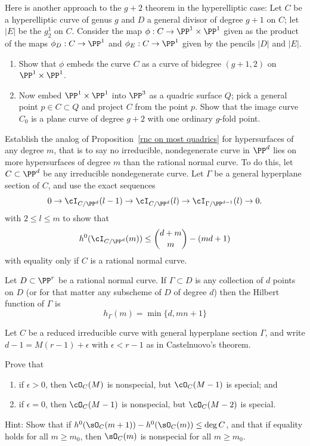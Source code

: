 \begin{exercise}
Here is another approach to the $g+2$ theorem in the hyperelliptic case: 
Let $C$ be a hyperelliptic curve of genus $g$ and $D$ a general divisor of degree $g+1$ on $C$; let $|E|$ be the $g^1_2$ on $C$.
Consider the map $\phi : C \to \PP^1 \times \PP^1$ given as the product of the maps $\phi_D : C \to \PP^1$ and $\phi_E : C \to \PP^1$ given by the pencils $|D|$ and $|E|$.
\begin{enumerate}
\item Show that $\phi$ embeds the curve $C$ as a curve of bidegree $(g+1,2)$ on $\PP^1 \times \PP^1$.
\item Now embed $\PP^1 \times \PP^1$ into $\PP^3$ as a quadric surface $Q$; pick a general point $p \in C \subset Q$ and project $C$ from the point $p$. Show that the image curve $C_0$ is a plane curve of degree $g+2$ with one ordinary $g$-fold point.
\end{enumerate}
\end{exercise}

\begin{exercise}\label{extremal m-ics}
Establish the analog of Proposition~\ref{rnc on most quadrics} for hypersurfaces of any degree $m$, that is to say no irreducible, nondegenerate curve in $\PP^d$ lies on more hypersurfaces of degree $m$ than the rational normal curve.
To do this, let $C\subset \PP^d$ be any irreducible nondegenerate curve. Let $\Gamma$ be a general hyperplane section
of $C$, and use the exact sequences
$$
0 \to \cI_{C/\PP^d}(l-1) \to \cI_{C/\PP^d}(l) \to \cI_{\Gamma/\PP^{d-1}}(l) \to 0.
$$ 
with $2 \leq l \leq m$ to show that
$$
h^0(\cI_{C/\PP^d}(m)) \leq  \binom{d+m}{m} - (md+1)
$$
with equality only if $C$ is a rational normal curve.
\end{exercise}

\begin{exercise}\label{linear bound is sharp}
Let $D \subset \PP^r$ be a rational normal curve. If $\Gamma \subset D$ is any collection of $d$ points on $D$ (or for that matter any subscheme of $D$ of degree $d$) then the Hilbert function of $\Gamma$ is
$$
h_\Gamma(m) = \min\{d, mn+1\}
$$
\end{exercise} 

\begin{exercise}
Let $C$ be a reduced irreducible curve with general hyperplane section $\Gamma$,
and write 
$d-1 = M(r-1) +\epsilon$ with $\epsilon<r-1$ as in Castelnuovo's theorem.
 
Prove that
\begin{enumerate}
\item if $\epsilon > 0$, then $\cO_C(M)$ is nonspecial, but $\cO_C(M-1)$ is special; and
\item if $\epsilon = 0$, then $\cO_C(M-1)$ is nonspecial, but $\cO_C(M-2)$ is special.
\end{enumerate}

Hint: Show that if $h^{0}(\sO_{C}(m+1))-h^{0}(\sO_{C}(m)) \leq \deg C$, and that if equality holds for
all $m\geq m_{0}$, then $\sO_{C}(m) $ is nonspecial for all $m\geq m_{0}$.

\end{exercise}

